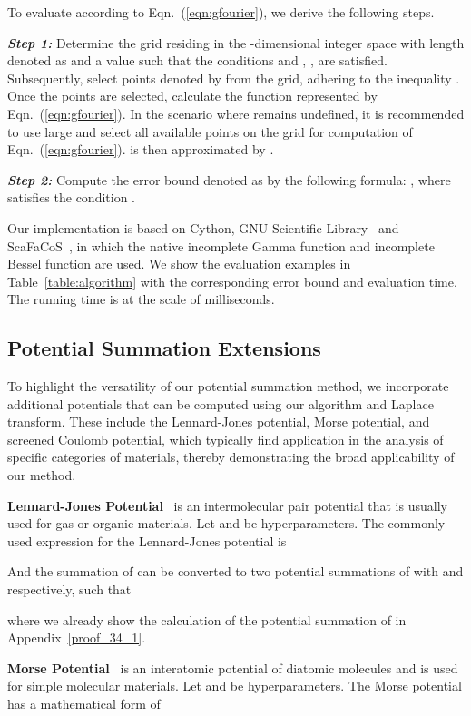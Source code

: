 \documentclass[nohyperref]{article}
\theoremstyle{plain}
\theoremstyle{definition}
\theoremstyle{remark}
\begin{document}
To evaluate  according to Eqn.~(\ref{eqn:gfourier}), we derive the following steps.


\emph{\textbf{Step 1:}} Determine the grid residing in the -dimensional integer space  with length denoted as  and a value  such that the conditions  and , ,  are satisfied. Subsequently, select points denoted by  from the grid, adhering to the inequality . Once the points are selected, calculate the function represented by Eqn.~(\ref{eqn:gfourier}). In the scenario where  remains undefined, it is recommended to use large  and select all available points on the grid for computation of Eqn.~(\ref{eqn:gfourier}).  is then approximated by .

\emph{\textbf{Step 2:}} Compute the error bound denoted as  by the following formula: , where  satisfies the condition .

Our implementation is based on Cython, GNU Scientific Library~\citep{galassi2002gnu} and ScaFaCoS~\citep{scafacos-web}, in which the native incomplete Gamma function and incomplete Bessel function are used. We show the evaluation examples in Table~\ref{table:algorithm} with the corresponding error bound and evaluation time. The running time is at the scale of milliseconds.


\subsection{Potential Summation Extensions}
\label{addition}

To highlight the versatility of our potential summation method, we incorporate additional potentials that can be computed using our algorithm and Laplace transform. These include the Lennard-Jones potential, Morse potential, and screened Coulomb potential, which typically find application in the analysis of specific categories of materials, thereby demonstrating the broad applicability of our method. 


\textbf{Lennard-Jones Potential}~\citep{lj} is an intermolecular pair potential that is usually used for gas or organic materials. Let  and  be hyperparameters. The commonly used expression for the Lennard-Jones potential is

And the summation of  can be converted to two potential summations of  with  and  respectively, such that

where we already show the calculation of the potential summation of  in Appendix~\ref{proof_34_1}.

\textbf{Morse Potential}~\citep{morse1929diatomic} is an interatomic potential of diatomic molecules and is used for simple molecular materials. Let  and  be hyperparameters. The Morse potential has a mathematical form of
\end{document}
